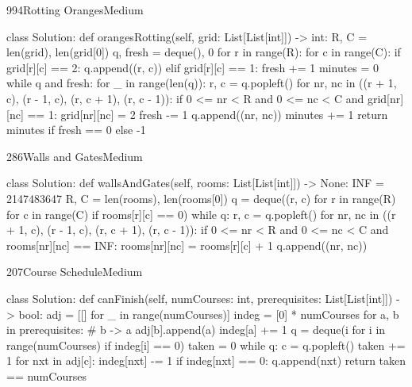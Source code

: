\begin{problem}{994}{Rotting Oranges}{Medium}
\begin{code}
class Solution:
    def orangesRotting(self, grid: List[List[int]]) -> int:
        R, C = len(grid), len(grid[0])
        q, fresh = deque(), 0
        for r in range(R):
            for c in range(C):
                if grid[r][c] == 2: q.append((r, c))
                elif grid[r][c] == 1: fresh += 1
        minutes = 0
        while q and fresh:
            for _ in range(len(q)):
                r, c = q.popleft()
                for nr, nc in ((r + 1, c), (r - 1, c), (r, c + 1), (r, c - 1)):
                    if 0 <= nr < R and 0 <= nc < C and grid[nr][nc] == 1:
                        grid[nr][nc] = 2
                        fresh -= 1
                        q.append((nr, nc))
            minutes += 1
        return minutes if fresh == 0 else -1
\end{code}
\end{problem}

\begin{problem}{286}{Walls and Gates}{Medium}
\begin{code}
class Solution:
    def wallsAndGates(self, rooms: List[List[int]]) -> None:
        INF = 2147483647
        R, C = len(rooms), len(rooms[0])
        q = deque((r, c) for r in range(R) for c in range(C) if rooms[r][c] == 0)
        while q:
            r, c = q.popleft()
            for nr, nc in ((r + 1, c), (r - 1, c), (r, c + 1), (r, c - 1)):
                if 0 <= nr < R and 0 <= nc < C and rooms[nr][nc] == INF:
                    rooms[nr][nc] = rooms[r][c] + 1
                    q.append((nr, nc))
\end{code}
\end{problem}

\begin{problem}{207}{Course Schedule}{Medium}
\begin{code}
class Solution:
    def canFinish(self, numCourses: int, prerequisites: List[List[int]]) -> bool:
        adj = [[] for _ in range(numCourses)]
        indeg = [0] * numCourses
        for a, b in prerequisites:          # b -> a
            adj[b].append(a)
            indeg[a] += 1
        q = deque(i for i in range(numCourses) if indeg[i] == 0)
        taken = 0
        while q:
            c = q.popleft()
            taken += 1
            for nxt in adj[c]:
                indeg[nxt] -= 1
                if indeg[nxt] == 0:
                    q.append(nxt)
        return taken == numCourses
\end{code}
\end{problem}

